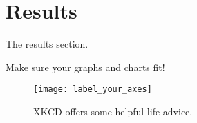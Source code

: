 \section{Results}

The results section.

Make sure your graphs and charts fit!

\begin{figure}[H]
  \centering
  \texttt{[image: label\_your\_axes]}
  \caption{XKCD offers some helpful life advice.}
  \label{fig:axis-labels}
\end{figure}
